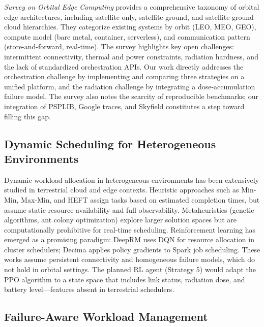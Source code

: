\documentclass[conference]{IEEEtran}
\begin{document}
\textit{Survey on Orbital Edge Computing} \cite{orbital-edge-survey} provides a comprehensive taxonomy of orbital edge architectures, including satellite-only, satellite-ground, and satellite-ground-cloud hierarchies. They categorize existing systems by orbit (LEO, MEO, GEO), compute model (bare metal, container, serverless), and communication pattern (store-and-forward, real-time). The survey highlights key open challenges: intermittent connectivity, thermal and power constraints, radiation hardness, and the lack of standardized orchestration APIs. Our work directly addresses the orchestration challenge by implementing and comparing three strategies on a unified platform, and the radiation challenge by integrating a dose-accumulation failure model. The survey also notes the scarcity of reproducible benchmarks; our integration of PSPLIB, Google traces, and Skyfield constitutes a step toward filling this gap.

\subsection{Dynamic Scheduling for Heterogeneous Environments}

Dynamic workload allocation in heterogeneous environments has been extensively studied in terrestrial cloud and edge contexts. Heuristic approaches such as Min-Min, Max-Min, and HEFT \cite{heft} assign tasks based on estimated completion times, but assume static resource availability and full observability. Metaheuristics (genetic algorithms, ant colony optimization) explore larger solution spaces but are computationally prohibitive for real-time scheduling. Reinforcement learning has emerged as a promising paradigm: DeepRM \cite{deeprm} uses DQN for resource allocation in cluster schedulers; Decima \cite{decima} applies policy gradients to Spark job scheduling. These works assume persistent connectivity and homogeneous failure models, which do not hold in orbital settings. The planned RL agent (Strategy 5) would adapt the PPO algorithm to a state space that includes link status, radiation dose, and battery level---features absent in terrestrial schedulers.

\subsection{Failure-Aware Workload Management}
\end{document}
